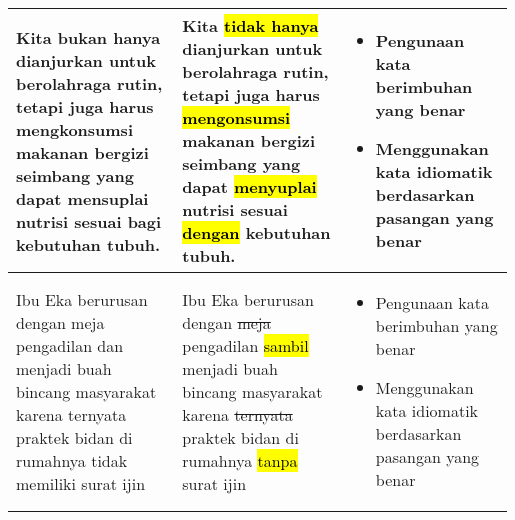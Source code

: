 \documentclass[
	10pt, %
	indonesian
]{assignment}
\begin{document}
\begin{center}
\begin{longtable}{ p{0.33\linewidth} | p{0.33\linewidth} | p{0.33\linewidth}}
		\midrule

		Kita bukan hanya dianjurkan untuk berolahraga rutin, tetapi juga harus
		mengkonsumsi makanan bergizi seimbang yang dapat mensuplai nutrisi
		sesuai bagi kebutuhan tubuh.
		     &
		Kita \hl{tidak hanya} dianjurkan untuk berolahraga rutin, tetapi juga harus
		\hl{mengonsumsi} makanan bergizi seimbang yang dapat \hl{menyuplai} nutrisi
		sesuai \hl{dengan} kebutuhan tubuh.
		     &
		\begin{itemize}
			\item Pengunaan kata berimbuhan yang benar
			\item Menggunakan kata idiomatik berdasarkan pasangan yang benar
		\end{itemize} \\

		\midrule

		Ibu Eka berurusan dengan meja pengadilan dan menjadi buah bincang
		masyarakat karena ternyata praktek bidan di rumahnya tidak memiliki surat ijin
		     &
		Ibu Eka berurusan dengan \st{meja} pengadilan \hl{sambil} menjadi buah bincang
		masyarakat karena \st{ternyata} praktek bidan di rumahnya \hl{tanpa} surat ijin
		     &
		\begin{itemize}
			\item Pengunaan kata berimbuhan yang benar
			\item Menggunakan kata idiomatik berdasarkan pasangan yang benar
		\end{itemize} \\

		\bottomrule
	\end{longtable}
\end{center}

\pagebreak
\end{document}
